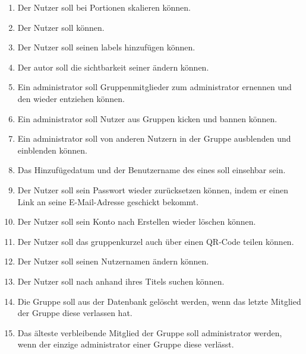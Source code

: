 \documentclass[parskip=full]{scrartcl}
\begin{document}
\begin{enumerate}[start=1,label={$\langle$\bfseries RS\arabic*$\rangle$}, leftmargin = 5em, itemsep=4pt, parsep=4pt]
    \item Der Nutzer soll bei  Portionen skalieren können.\label{rs:PortionScaling}
    \item Der Nutzer soll   können.\label{rs:RecipeFavourites}
    \item Der Nutzer soll seinen  \gls{labels} hinzufügen können.\label{rs:RecipeLabels}
    \item Der \gls{autor} soll die \gls{sichtbarkeit} seiner  ändern können.\label{rs:RecipeVisibility}
    \item Ein \gls{administrator} soll Gruppenmitglieder zum \gls{administrator} ernennen und den  wieder entziehen können.\label{rs:AdminCreation}
    \item Ein \gls{administrator} soll Nutzer aus Gruppen \gls{kicken} und \gls{bannen} können.\label{rs:Kicking}
    \item Ein \gls{administrator} soll  von anderen Nutzern in der Gruppe \gls{ausblenden} und \gls{einblenden} können.\label{rs:RecipeHiding}
    \item Das Hinzufügedatum und der Benutzername des  eines  soll einsehbar sein.\label{rs:AuthorAndDate}
    \item Der Nutzer soll sein Passwort wieder zurücksetzen können, indem er einen Link an seine E-Mail-Adresse geschickt bekommt.\label{rs:ResetPassword}
    \item Der Nutzer soll sein Konto nach Erstellen wieder löschen können.\label{rs:AccountDeletion}
    \item Der Nutzer soll das \gls{gruppenkurzel} auch über einen QR-Code teilen können.\label{rs:QRCode}
    \item Der Nutzer soll seinen Nutzernamen ändern können.\label{rs:ChangeUsername}
    \item Der Nutzer soll nach  anhand ihres Titels suchen können.\label{rs:Searching}
    \item Die Gruppe soll aus der Datenbank gelöscht werden, wenn das letzte Mitglied der Gruppe diese verlassen hat.\label{rs:EmptyGroup}
    \item Das älteste verbleibende Mitglied der Gruppe soll \gls{administrator} werden, wenn der einzige \gls{administrator} einer Gruppe diese verlässt.\label{rs:NoAdmins}

\end{enumerate}
\end{document}
